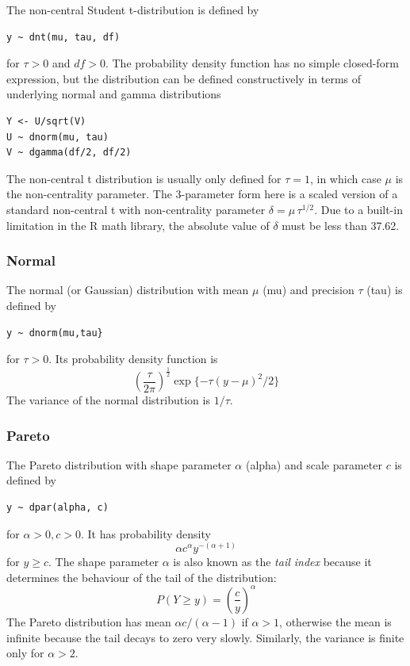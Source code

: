 \documentclass[11pt, a4paper, titlepage]{report}
\begin{document}
The non-central Student t-distribution is defined by
\begin{verbatim}
y ~ dnt(mu, tau, df)
\end{verbatim}
for $\tau > 0$ and $df > 0$. The probability density function has
no simple closed-form expression, but the distribution can be defined
constructively in terms of underlying normal and gamma distributions
\begin{verbatim}
Y <- U/sqrt(V)
U ~ dnorm(mu, tau)
V ~ dgamma(df/2, df/2)
\end{verbatim}
The non-central t distribution is usually only defined for $\tau = 1$,
in which case $\mu$ is the non-centrality parameter. The 3-parameter
form here is a scaled version of a standard non-central t with
non-centrality parameter $\delta = \mu \, \tau^{1/2}$. Due to a built-in
limitation in the R math library, the absolute value of $\delta$ must
be less than 37.62.

\subsubsection{Normal}
\label{bugs:dnorm}

The normal (or Gaussian) distribution with mean $\mu$ (mu) and precision
$\tau$ (tau) is defined by
\begin{verbatim}
y ~ dnorm(mu,tau}
\end{verbatim}
for $\tau > 0$. Its probability density function is
\[
\left(\frac{\tau}{2\pi}\right)^{\frac{1}{2}} \exp\{- \tau (y - \mu)^2 / 2\}
\]
The variance of the normal distribution is $1/\tau$.


\subsubsection{Pareto}
\label{bugs:pareto}

The Pareto distribution with shape parameter $\alpha$ (alpha) and scale
parameter $c$ is defined by
\begin{verbatim}
y ~ dpar(alpha, c)
\end{verbatim}
for $\alpha > 0, c > 0$. It has probability density
\[
\alpha c^{\alpha} y^{-(\alpha + 1)}
\]
for $y \geq c$. The shape parameter $\alpha$ is also known as the {\em tail
  index} because it determines the behaviour of the tail of the
distribution:
\[
P(Y \geq y) = \left( \frac{c}{y} \right)^\alpha
\]
The Pareto distribution has mean $\alpha c/(\alpha-1)$ if $\alpha >
1$, otherwise the mean is infinite because the tail decays to zero
very slowly. Similarly, the variance is finite only for $\alpha > 2$.
\end{document}
